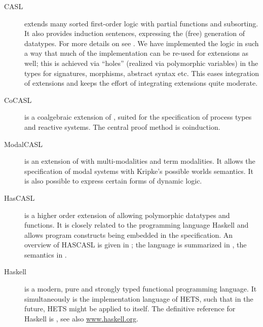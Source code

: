 \documentclass{article}
\newcommand{\normalTEXTSC}[2]{{#1\scriptsize#2}}
\newcommand     {\Hets}{\normalTEXTSC{H}{ETS}\xspace}
\newcommand{\Dolce}{\textmd{\textsc{Dolce}}\xspace}
\newcommand     {\HasCASL}{\normalTEXTSC{H}{AS}\normalTEXTSC{C}{ASL}\xspace}
\begin{document}
\begin{description}
  
\item[CASL] extends many sorted first-order logic with partial
  functions and subsorting.  It also provides induction sentences,
  expressing the (free) generation of datatypes.
For more details on \CASL see \cite{CASL-RM,CASL-UM}.
%
We have implemented the \CASL logic in such a way that much of the
implementation can be re-used for \CASL extensions as well; this
is achieved via ``holes'' (realized via polymorphic variables) in the
types for signatures, morphisms, abstract syntax etc.  This eases
integration of \CASL extensions and keeps the effort of integrating
\CASL extensions quite moderate.

\item[CoCASL] \cite{MossakowskiEA04} is a coalgebraic extension of \CASL,
suited for the specification of process types and reactive systems.
The central proof method is coinduction.

\item[ModalCASL] \cite{ModalCASL}
 is an extension of \CASL with multi-modalities and
term modalities. It allows the specification of modal systems with 
Kripke's possible worlds semantics. It is also possible to express
certain forms of dynamic logic. 

\item[HasCASL] is a higher order extension of \CASL allowing
  polymorphic datatypes and functions. It is closely related to the
  programming language Haskell and allows program constructs being
  embedded in the specification. 
  An overview of \HasCASL is given in \cite{Schroeder:2002:HIS};
the language is summarized in \cite{HasCASL/Summary}, the semantics
in \cite{Schroder05b,Schroder-habil}.

\item[Haskell] is a modern, pure and strongly typed functional
  programming language. It simultaneously is the implementation
  language of \Hets, such that in the future, \Hets might be applied
  to itself.
The definitive reference for Haskell is \cite{PeytonJones03},
see also \url{www.haskell.org}. 
  

\end{description}
\end{document}
